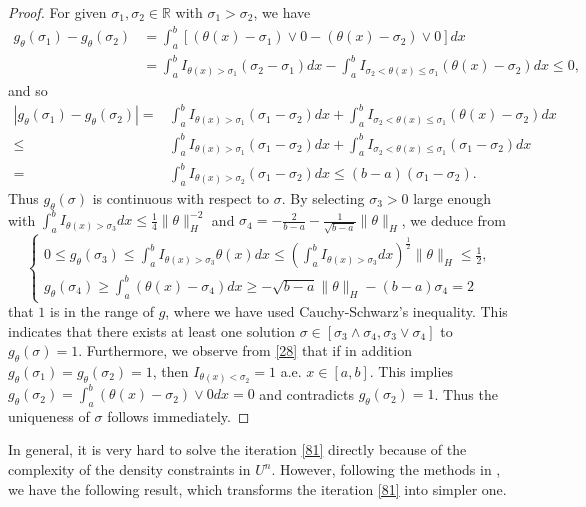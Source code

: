 \documentclass[10pt]{article}
\begin{document}
\begin{proof}
For given $\sigma_1,\sigma_2\in\mathbb{R}$ with $\sigma_1>\sigma_2$, we have
\begin{align}\label{28}
g_{\theta}(\sigma_1)-g_{\theta}(\sigma_2)&= \int_a^b[(\theta(x)-\sigma_1)\vee 0-(\theta(x)-\sigma_2)\vee 0]dx\nonumber\\
&= \int_a^bI_{\theta(x)>\sigma_1}(\sigma_2-\sigma_1)dx-\int_a^bI_{\sigma_2<\theta(x)\leq\sigma_1}(\theta(x)-\sigma_2)dx\leq0,
\end{align}
and so
\begin{align*}
|g_{\theta}(\sigma_1)-g_{\theta}(\sigma_2)|=&\int_a^bI_{\theta(x)>\sigma_1}(\sigma_1-\sigma_2)dx+\int_a^bI_{\sigma_2<\theta(x)\leq\sigma_1}(\theta(x)-\sigma_2)dx\\
\leq&\int_a^bI_{\theta(x)>\sigma_1}(\sigma_1-\sigma_2)dx+\int_a^bI_{\sigma_2<\theta(x)\leq\sigma_1}(\sigma_1-\sigma_2)dx\\
=&\int_a^bI_{\theta(x)>\sigma_2}(\sigma_1-\sigma_2)dx
\leq(b-a)(\sigma_1-\sigma_2).
\end{align*}
Thus $g_{\theta}(\sigma)$ is continuous with respect to $\sigma$. By selecting $\sigma_3>0$ large enough with $\int_a^bI_{\theta(x)>\sigma_3}dx\leq\frac{1}{4}\|\theta\|^{-2}_H$ and $\sigma_4=-\frac{2}{b-a}-\frac{1}{\sqrt{b-a}}\|\theta\|_H$, we deduce from
\begin{equation*}
\begin{cases}
 0\leq g_{\theta}(\sigma_3)\leq\int_a^bI_{\theta(x)>\sigma_3}\theta(x)dx\leq
(\int_a^bI_{\theta(x)>\sigma_3}dx)^{\frac{1}{2}}\|\theta\|_H\leq\frac{1}{2},\\
g_{\theta}(\sigma_4)\geq \int_a^b(\theta(x)-\sigma_4)dx\geq -\sqrt{b-a}\|\theta\|_H-(b-a)\sigma_4=2
\end{cases}
\end{equation*}
that  $1$ is in the  range of $g$, where we have used Cauchy-Schwarz's inequality. This indicates that there exists at least one solution $\sigma\in[\sigma_3\wedge\sigma_4,\sigma_3\vee\sigma_4]$ to $g_{\theta}(\sigma)=1$. Furthermore, we observe from \eqref{28} that if in addition $g_{\theta}(\sigma_1)=g_{\theta}(\sigma_2)=1$, then $I_{\theta(x)<\sigma_2}=1$ a.e. $x\in[a,b]$. This implies $g_{\theta}(\sigma_2)=\int_a^b(\theta(x)-\sigma_2)\vee 0dx=0$ and contradicts $g_{\theta}(\sigma_2)=1$. Thus the uniqueness of $\sigma$ follows immediately.
\end{proof}
In general, it is very hard to solve the iteration  \eqref{81} directly because of the complexity of the density constraints in $U^n$. However,  following the methods in \citep[Lemma 3.3]{yong2020stochastic}, we have the following result, which transforms the iteration  \eqref{81} into    simpler one.
\end{document}
